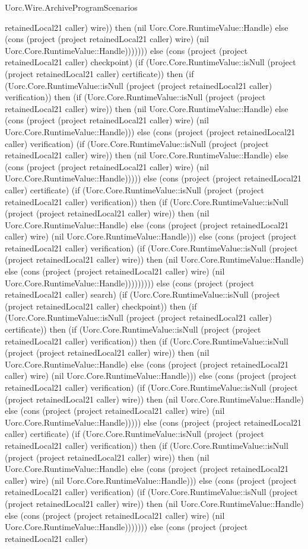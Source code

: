 \begin{lexlean}{Uorc.Wire.ArchiveProgramScenarios}
\begin{semanticmodule}
{retainedLocal21 caller) wire)) then (nil Uorc.Core.RuntimeValue::Handle) else (cons (project (project retainedLocal21 caller) wire) (nil Uorc.Core.RuntimeValue::Handle))))))) else (cons (project (project retainedLocal21 caller) checkpoint) (if (Uorc.Core.RuntimeValue::isNull (project (project retainedLocal21 caller) certificate)) then (if (Uorc.Core.RuntimeValue::isNull (project (project retainedLocal21 caller) verification)) then (if (Uorc.Core.RuntimeValue::isNull (project (project retainedLocal21 caller) wire)) then (nil Uorc.Core.RuntimeValue::Handle) else (cons (project (project retainedLocal21 caller) wire) (nil Uorc.Core.RuntimeValue::Handle))) else (cons (project (project retainedLocal21 caller) verification) (if (Uorc.Core.RuntimeValue::isNull (project (project retainedLocal21 caller) wire)) then (nil Uorc.Core.RuntimeValue::Handle) else (cons (project (project retainedLocal21 caller) wire) (nil Uorc.Core.RuntimeValue::Handle))))) else (cons (project (project retainedLocal21 caller) certificate) (if (Uorc.Core.RuntimeValue::isNull (project (project retainedLocal21 caller) verification)) then (if (Uorc.Core.RuntimeValue::isNull (project (project retainedLocal21 caller) wire)) then (nil Uorc.Core.RuntimeValue::Handle) else (cons (project (project retainedLocal21 caller) wire) (nil Uorc.Core.RuntimeValue::Handle))) else (cons (project (project retainedLocal21 caller) verification) (if (Uorc.Core.RuntimeValue::isNull (project (project retainedLocal21 caller) wire)) then (nil Uorc.Core.RuntimeValue::Handle) else (cons (project (project retainedLocal21 caller) wire) (nil Uorc.Core.RuntimeValue::Handle))))))))) else (cons (project (project retainedLocal21 caller) search) (if (Uorc.Core.RuntimeValue::isNull (project (project retainedLocal21 caller) checkpoint)) then (if (Uorc.Core.RuntimeValue::isNull (project (project retainedLocal21 caller) certificate)) then (if (Uorc.Core.RuntimeValue::isNull (project (project retainedLocal21 caller) verification)) then (if (Uorc.Core.RuntimeValue::isNull (project (project retainedLocal21 caller) wire)) then (nil Uorc.Core.RuntimeValue::Handle) else (cons (project (project retainedLocal21 caller) wire) (nil Uorc.Core.RuntimeValue::Handle))) else (cons (project (project retainedLocal21 caller) verification) (if (Uorc.Core.RuntimeValue::isNull (project (project retainedLocal21 caller) wire)) then (nil Uorc.Core.RuntimeValue::Handle) else (cons (project (project retainedLocal21 caller) wire) (nil Uorc.Core.RuntimeValue::Handle))))) else (cons (project (project retainedLocal21 caller) certificate) (if (Uorc.Core.RuntimeValue::isNull (project (project retainedLocal21 caller) verification)) then (if (Uorc.Core.RuntimeValue::isNull (project (project retainedLocal21 caller) wire)) then (nil Uorc.Core.RuntimeValue::Handle) else (cons (project (project retainedLocal21 caller) wire) (nil Uorc.Core.RuntimeValue::Handle))) else (cons (project (project retainedLocal21 caller) verification) (if (Uorc.Core.RuntimeValue::isNull (project (project retainedLocal21 caller) wire)) then (nil Uorc.Core.RuntimeValue::Handle) else (cons (project (project retainedLocal21 caller) wire) (nil Uorc.Core.RuntimeValue::Handle))))))) else (cons (project (project retainedLocal21 caller) }
\end{semanticmodule}
\end{lexlean}
